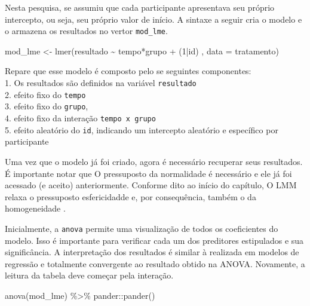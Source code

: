 \documentclass[
]{book}
\newenvironment{Shaded}{\begin{snugshade}}{\end{snugshade}}
\newcommand{\AttributeTok}[1]{\textcolor[rgb]{0.77,0.63,0.00}{#1}}
\newcommand{\DecValTok}[1]{\textcolor[rgb]{0.00,0.00,0.81}{#1}}
\newcommand{\FunctionTok}[1]{\textcolor[rgb]{0.00,0.00,0.00}{#1}}
\newcommand{\NormalTok}[1]{#1}
\newcommand{\OtherTok}[1]{\textcolor[rgb]{0.56,0.35,0.01}{#1}}
\newcommand{\SpecialCharTok}[1]{\textcolor[rgb]{0.00,0.00,0.00}{#1}}
\begin{document}
Nesta pesquisa, se assumiu que cada participante apresentava seu próprio intercepto, ou seja, seu próprio valor de início. A sintaxe a seguir cria o modelo e o armazena os resultados no vertor \texttt{mod\_lme}.

\begin{Shaded}
\begin{Highlighting}[]
\NormalTok{mod\_lme }\OtherTok{\textless{}{-}} \FunctionTok{lmer}\NormalTok{(resultado }\SpecialCharTok{\textasciitilde{}}\NormalTok{ tempo}\SpecialCharTok{*}\NormalTok{grupo }\SpecialCharTok{+}\NormalTok{ (}\DecValTok{1}\SpecialCharTok{|}\NormalTok{id) , }\AttributeTok{data =}\NormalTok{ tratamento)}
\end{Highlighting}
\end{Shaded}

Repare que esse modelo é composto pelo se seguintes componentes:\\
1. Os resultados são definidos na variável \texttt{resultado}\\
2. efeito fixo do \texttt{tempo}\\
3. efeito fixo do \texttt{grupo},\\
4. efeito fixo da interação \texttt{tempo\ x\ grupo}\\
5. efeito aleatório do \texttt{id}, indicando um intercepto aleatório e específico por participante

Uma vez que o modelo já foi criado, agora é necessário recuperar seus resultados. É importante notar que O pressuposto da normalidade é necessário e ele já foi acessado (e aceito) anteriormente. Conforme dito ao início do capítulo, O LMM relaxa o pressuposto esfericidadde e, por consequência, também o da homogeneidade \citep{Quen2004}.

Inicialmente, a \texttt{anova} permite uma visualização de todos os coeficientes do modelo. Isso é importante para verificar cada um dos preditores estipulados e sua significância. A interpretação dos resultados é similar à realizada em modelos de regressão e totalmente convergente ao resultado obtido na ANOVA. Novamente, a leitura da tabela deve começar pela interação.

\begin{Shaded}
\begin{Highlighting}[]
\FunctionTok{anova}\NormalTok{(mod\_lme) }\SpecialCharTok{\%\textgreater{}\%}\NormalTok{ pander}\SpecialCharTok{::}\FunctionTok{pander}\NormalTok{()}
\end{Highlighting}
\end{Shaded}
\end{document}
